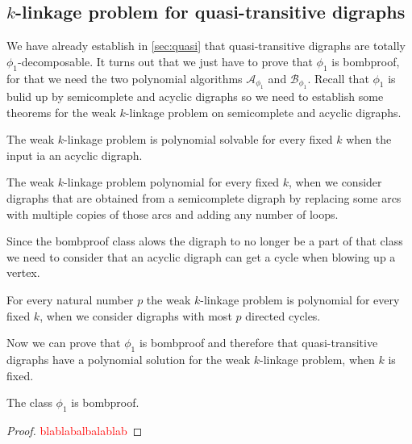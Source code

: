 \subsection{$k$-linkage problem for quasi-transitive digraphs}
We have already establish in \autoref{sec:quasi} that quasi-transitive digraphs are totally $\phi_1$-decomposable.
It turns out that we just have to prove that $\phi_1$ is bombproof, for that we need the two polynomial algorithms $\mathcal{A}_{\phi_1}$ and $\mathcal{B}_{\phi_1}$. Recall that $\phi_1$ is bulid up by semicomplete and acyclic digraphs so we need to establish some theorems for the weak $k$-linkage problem on semicomplete and acyclic digraphs.
\begin{thm}
    The weak $k$-linkage problem is polynomial solvable for every fixed $k$ when the input ia an acyclic digraph.
\end{thm}
\begin{thm}
    The weak $k$-linkage problem polynomial for every fixed $k$, when we consider digraphs that are obtained from a semicomplete digraph by replacing some arcs with multiple copies of those arcs and adding any number of loops.
\end{thm}

Since the bombproof class alows the digraph to no longer be a part of that class we need to consider that an acyclic digraph can get a cycle when blowing up a vertex. 
\begin{thm}
    For every natural number $p$ the weak $k$-linkage problem is polynomial for every fixed $k$, when we consider digraphs with most $p$ directed cycles.
\end{thm}

Now we can prove that $\phi_1$ is bombproof and therefore that quasi-transitive digraphs have a polynomial solution for the weak $k$-linkage problem, when $k$ is fixed.

\begin{thm}
    The class $\phi_1$ is bombproof.
\end{thm}
\begin{proof}
    \textcolor{red}{blablabalbalablab}
\end{proof}

